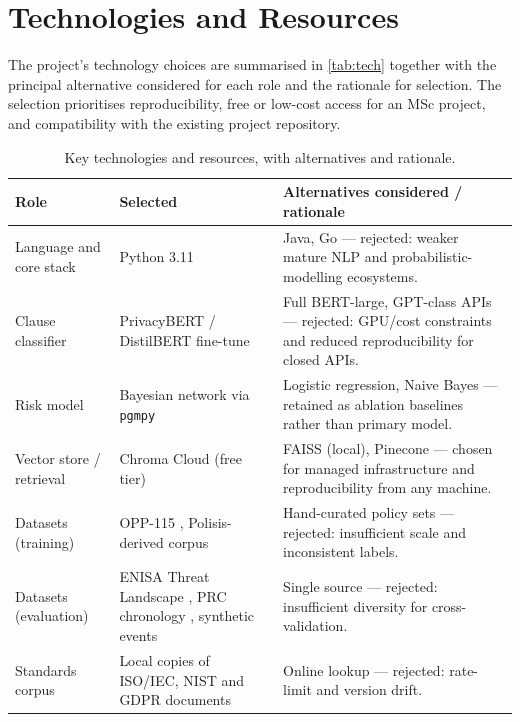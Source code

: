 \documentclass[12pt,a4paper,titlepage]{article}
\let\orgautoref\autoref
\renewcommand{\autoref}[1]{\def\equationautorefname{Eq.}\orgautoref{#1}}
\begin{document}
\section{Technologies and Resources}\label{sec:tech}

The project's technology choices are summarised in \autoref{tab:tech} together with the principal alternative considered for each role and the rationale for selection. The selection prioritises reproducibility, free or low-cost access for an MSc project, and compatibility with the existing project repository.

\begin{table}[hbt]
    \centering
    \caption{Key technologies and resources, with alternatives and rationale.}
    \label{tab:tech}
    \small
    \begin{tabularx}{\linewidth}{@{}l X X@{}}
        \toprule
        \textbf{Role} & \textbf{Selected} & \textbf{Alternatives considered / rationale} \\
        \midrule
        Language and core stack & Python 3.11 & Java, Go --- rejected: weaker mature NLP and probabilistic-modelling ecosystems. \\
        Clause classifier & PrivacyBERT / DistilBERT fine-tune \parencite{devlin2019bert, muralitharan2024privacybertlstm} & Full BERT-large, GPT-class APIs --- rejected: GPU/cost constraints and reduced reproducibility for closed APIs. \\
        Risk model & Bayesian network via \texttt{pgmpy} \parencite{koller2009pgm} & Logistic regression, Naive Bayes --- retained as ablation baselines rather than primary model. \\
        Vector store / retrieval & Chroma Cloud (free tier) & FAISS (local), Pinecone --- chosen for managed infrastructure and reproducibility from any machine. \\
        Datasets (training) & OPP-115 \parencite{wilson2016opp115}, Polisis-derived corpus \parencite{harkous2018polisis} & Hand-curated policy sets --- rejected: insufficient scale and inconsistent labels. \\
        Datasets (evaluation) & ENISA Threat Landscape \parencite{enisa_tl_2024}, PRC chronology \parencite{prc_breaches}, synthetic events & Single source --- rejected: insufficient diversity for cross-validation. \\
        Standards corpus & Local copies of ISO/IEC, NIST and GDPR documents \parencite{iso27001_2022, iso27701_2019, iso29100_2011, iso29151_2017, nist_pf_2020, nist_aiRMF_2023, gdpr2016} & Online lookup --- rejected: rate-limit and version drift. \\

\end{tabularx}
\end{table}
\end{document}
